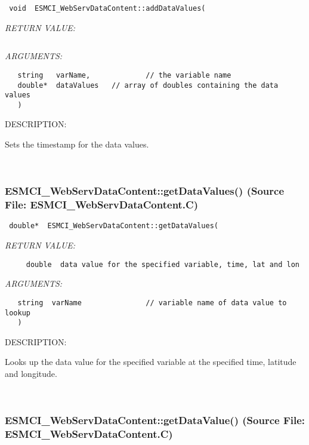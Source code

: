   
\begin{verbatim} void  ESMCI_WebServDataContent::addDataValues(\end{verbatim}{\em RETURN VALUE:}
\begin{verbatim} \end{verbatim}{\em ARGUMENTS:}
\begin{verbatim}   string   varName,             // the variable name
   double*  dataValues   // array of doubles containing the data values
   )\end{verbatim}
{\sf DESCRIPTION:\\ }


      Sets the timestamp for the data values.
   
 
\mbox{}\hrulefill\
 
\subsubsection{ESMCI\_WebServDataContent::getDataValues() (Source File: ESMCI\_WebServDataContent.C)}


  
\begin{verbatim} double*  ESMCI_WebServDataContent::getDataValues(\end{verbatim}{\em RETURN VALUE:}
\begin{verbatim}     double  data value for the specified variable, time, lat and lon\end{verbatim}{\em ARGUMENTS:}
\begin{verbatim}   string  varName               // variable name of data value to lookup
   )\end{verbatim}
{\sf DESCRIPTION:\\ }


      Looks up the data value for the specified variable at the specified
      time, latitude and longitude.
   
 
\mbox{}\hrulefill\
 
\subsubsection{ESMCI\_WebServDataContent::getDataValue() (Source File: ESMCI\_WebServDataContent.C)}


